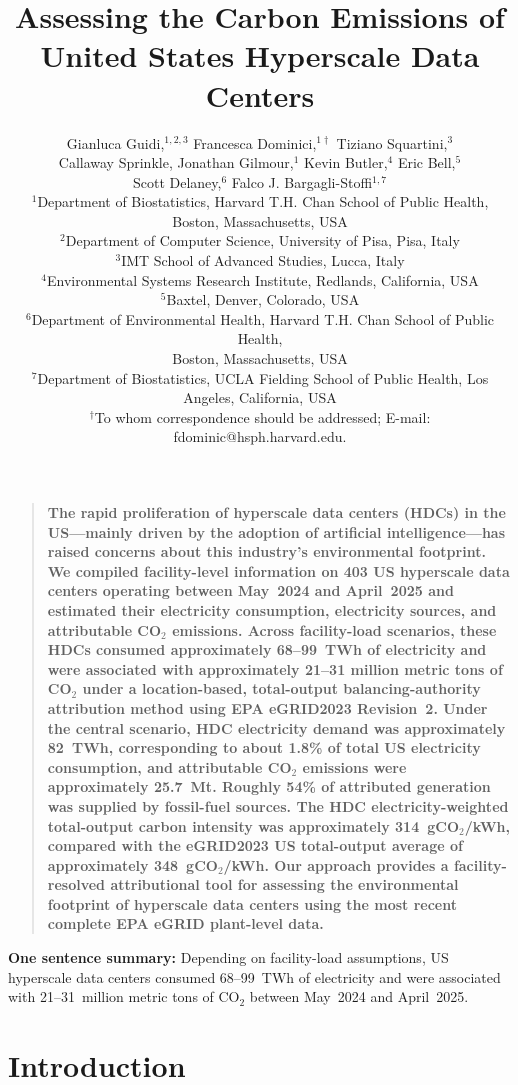 \documentclass[12pt]{article}
\title{Assessing the Carbon Emissions of United States Hyperscale Data Centers}
\author
{Gianluca Guidi,$^{1,2,3}$ Francesca Dominici,$^{1\dagger}$ Tiziano Squartini,$^{3}$ \\ Callaway Sprinkle, Jonathan Gilmour,$^{1}$ Kevin Butler,$^{4}$ Eric Bell,$^{5}$\\ Scott Delaney,$^{6}$ Falco J. Bargagli-Stoffi$^{1,7}$
\\
\footnotesize{$^{1}$Department of Biostatistics, Harvard T.H. Chan School of Public Health,}\\ \footnotesize{Boston, Massachusetts, USA
}\\
\footnotesize{$^{2}$Department of Computer Science, University of Pisa, Pisa, Italy}\\
\footnotesize{$^{3}$IMT School of Advanced Studies, Lucca, Italy}\\
\footnotesize{$^{4}$Environmental Systems Research Institute, Redlands, California, USA}\\
\footnotesize{$^{5}$Baxtel, Denver, Colorado, USA}\\ 
\footnotesize{$^{6}$Department of Environmental Health, Harvard T.H. Chan School of Public Health,}\\ 
\footnotesize{Boston, Massachusetts, USA}\\
\footnotesize{$^{7}$Department of Biostatistics, UCLA Fielding School of Public Health, Los Angeles, California, USA}\\
\scriptsize{$^\dagger$To whom correspondence should be addressed; E-mail:  fdominic@hsph.harvard.edu.}
}
\date{}
\newenvironment{sciabstract}{%
\begin{quote} \bf}
{\end{quote}}
\begin{document}
 

\linenumbers
\baselineskip24pt


\maketitle 

\vspace{-1cm}

\singlespacing
\begin{sciabstract}
The rapid proliferation of hyperscale data centers (HDCs) in the US---mainly driven by the adoption of artificial intelligence---has raised concerns about this industry's environmental footprint. We compiled facility-level information on 403 US hyperscale data centers operating between May~2024 and April~2025 and estimated their electricity consumption, electricity sources, and attributable CO$_2$ emissions. Across facility-load scenarios, these HDCs consumed approximately 68--99~TWh of electricity and were associated with approximately 21--31 million metric tons of CO$_2$ under a location-based, total-output balancing-authority attribution method using EPA eGRID2023 Revision~2. Under the central scenario, HDC electricity demand was approximately 82~TWh, corresponding to about 1.8\% of total US electricity consumption, and attributable CO$_2$ emissions were approximately 25.7~Mt. Roughly 54\% of attributed generation was supplied by fossil-fuel sources. The HDC electricity-weighted total-output carbon intensity was approximately 314~gCO$_2$/kWh, compared with the eGRID2023 US total-output average of approximately 348~gCO$_2$/kWh. Our approach provides a facility-resolved attributional tool for assessing the environmental footprint of hyperscale data centers using the most recent complete EPA eGRID plant-level data.
\end{sciabstract}

{\noindent \textbf{One sentence summary:} Depending on facility-load assumptions, US hyperscale data centers consumed 68--99~TWh of electricity and were associated with 21--31~million metric tons of CO$_2$ between May~2024 and April~2025.}
\thispagestyle{empty}
\clearpage
\newpage

\setcounter{page}{1}

\section*{Introduction}
\end{document}
